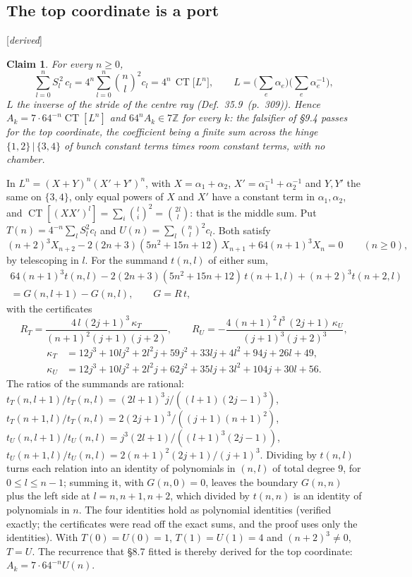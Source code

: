 \documentclass[11pt]{article}
\DeclareMathOperator*{\CT}{CT}
\newcommand{\status}[1]{\hfill{\small[\textit{#1}]}}
\newcommand{\hb}[2]{#1~(p.~#2)}   %
\theoremstyle{plain}
\newtheorem{claim}{Claim}[section]
\theoremstyle{remark}
\begin{document}
\subsection{The top coordinate is a port}\status{derived}

\begin{claim}\label{cl:port4}
For every $n\ge0$,
\[
\sum_{l=0}^{n}S_l^{\,2}\,c_l=4^n\sum_{l=0}^{n}\binom nl^{\!2}c_l=4^n\,\CT\big[L^n\big],\qquad L=\Big(\sum_e\alpha_e\Big)\Big(\sum_e\alpha_e^{-1}\Big),
\]
$L$ the inverse of the stride of the centre ray (Def.~\hb{35.9}{309}). Hence $A_k=7\cdot64^{-n}\CT[L^n]$ and $64^nA_k\in7\mathbb Z$ for every $k$: the falsifier of \S9.4 passes for the top coordinate, the coefficient being a finite sum across the hinge $\{1,2\}\,|\,\{3,4\}$ of bunch constant terms times room constant terms, with no chamber.
\end{claim}

In $L^n=(X+Y)^n(X'+Y')^n$, with $X=\alpha_1+\alpha_2$, $X'=\alpha_1^{-1}+\alpha_2^{-1}$ and $Y,Y'$ the same on $\{3,4\}$, only equal powers of $X$ and $X'$ have a constant term in $\alpha_1,\alpha_2$, and $\CT[(XX')^l]=\sum_i\binom li^2=\binom{2l}l$: that is the middle sum. Put $T(n)=4^{-n}\sum_lS_l^2c_l$ and $U(n)=\sum_l\binom nl^2c_l$. Both satisfy
\[
(n+2)^3X_{n+2}-2(2n+3)(5n^2+15n+12)\,X_{n+1}+64(n+1)^3X_n=0\qquad(n\ge0),
\]
by telescoping in $l$. For the summand $t(n,l)$ of either sum,
\begin{multline*}
64(n+1)^3t(n,l)-2(2n+3)(5n^2+15n+12)\,t(n+1,l)+(n+2)^3t(n+2,l)\\
=G(n,l+1)-G(n,l),\qquad G=R\,t,
\end{multline*}
with the certificates
\[
R_T=\frac{4\,l\,(2j+1)^3\,\kappa_T}{(n+1)^2(j+1)(j+2)},\qquad R_U=-\frac{4\,(n+1)^2\,l^3\,(2j+1)\,\kappa_U}{(j+1)^3(j+2)^3},
\]
\begin{align*}
\kappa_T&=12j^3+10lj^2+2l^2j+59j^2+33lj+4l^2+94j+26l+49,\\
\kappa_U&=12j^3+10lj^2+2l^2j+62j^2+35lj+3l^2+104j+30l+56.
\end{align*}
The ratios of the summands are rational: $t_T(n,l+1)/t_T(n,l)=(2l+1)^3j/((l+1)(2j-1)^3)$, $t_T(n+1,l)/t_T(n,l)=2(2j+1)^3/((j+1)(n+1)^2)$, $t_U(n,l+1)/t_U(n,l)=j^3(2l+1)/((l+1)^3(2j-1))$, $t_U(n+1,l)/t_U(n,l)=2(n+1)^2(2j+1)/(j+1)^3$. Dividing by $t(n,l)$ turns each relation into an identity of polynomials in $(n,l)$ of total degree $9$, for $0\le l\le n-1$; summing it, with $G(n,0)=0$, leaves the boundary $G(n,n)$ plus the left side at $l=n,n+1,n+2$, which divided by $t(n,n)$ is an identity of polynomials in $n$. The four identities hold as polynomial identities (verified exactly; the certificates were read off the exact sums, and the proof uses only the identities). With $T(0)=U(0)=1$, $T(1)=U(1)=4$ and $(n+2)^3\ne0$, $T=U$. The recurrence that \S8.7 fitted is thereby derived for the top coordinate: $A_k=7\cdot64^{-n}U(n)$.
\end{document}
